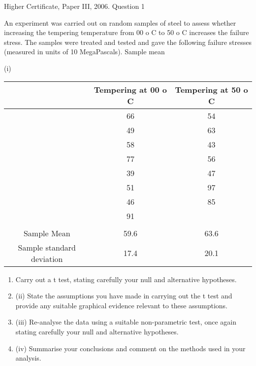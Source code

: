 \documentclass[a4paper,12pt]{article}
\begin{document}
Higher Certificate, Paper III, 2006. Question 1
\begin{framed}

An experiment was carried out on random samples of steel to assess whether
increasing the tempering temperature from 00 o C to 50 o C increases the failure stress.
The samples were treated and tested and gave the following failure stresses (measured
in units of 10 MegaPascals).
Sample mean

(i)

\begin{center}
\begin{tabular}{|ccc|}
	&	Tempering at 00 o C	&	Tempering at 50 o C	\\ \hline 
	&	66	&	54	\\
	&	49	&	63	\\
	&	58	&	43	\\
	&	77	&	56	\\
	&	39	&	47	\\
	&	51	&	97	\\
	&	46	&	85	\\
	&	91	&		\\
	&		&		\\
Sample Mean	&	59.6	&	63.6	\\ \hline 
Sample standard deviation	&	17.4	&	20.1	\\ \hline 
\end{tabular}
\end{center}


\begin{enumerate}
\item Carry out a t test, stating carefully your null and alternative hypotheses.
\item 
(ii) State the assumptions you have made in carrying out the t test and provide any
suitable graphical evidence relevant to these assumptions.
\item 
(iii) Re-analyse the data using a suitable non-parametric test, once again stating
carefully your null and alternative hypotheses.
\item 
(iv) Summarise your conclusions and comment on the methods used in your
analysis.
\end{enumerate}
\end{framed}
\end{document}

